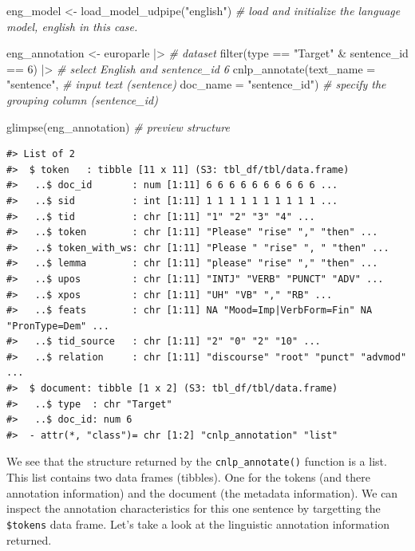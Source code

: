 \documentclass[
  letterpaper,
]{scrbook}
\newenvironment{Shaded}{\begin{snugshade}}{\end{snugshade}}
\newcommand{\AttributeTok}[1]{\textcolor[rgb]{0.00,0.00,0.00}{#1}}
\newcommand{\CommentTok}[1]{\textcolor[rgb]{0.00,0.00,0.00}{\textit{#1}}}
\newcommand{\DecValTok}[1]{\textcolor[rgb]{0.00,0.00,0.00}{#1}}
\newcommand{\FunctionTok}[1]{\textcolor[rgb]{0.00,0.00,0.00}{#1}}
\newcommand{\NormalTok}[1]{\textcolor[rgb]{0.00,0.00,0.00}{#1}}
\newcommand{\OtherTok}[1]{\textcolor[rgb]{0.00,0.00,0.00}{#1}}
\newcommand{\SpecialCharTok}[1]{\textcolor[rgb]{0.00,0.00,0.00}{#1}}
\newcommand{\StringTok}[1]{\textcolor[rgb]{0.00,0.00,0.00}{#1}}
\begin{document}
\begin{Shaded}
\begin{Highlighting}[]
\NormalTok{eng\_model }\OtherTok{\textless{}{-}} \FunctionTok{load\_model\_udpipe}\NormalTok{(}\StringTok{"english"}\NormalTok{) }\CommentTok{\# load and initialize the language model, \textquotesingle{}english\textquotesingle{} in this case.}

\NormalTok{eng\_annotation }\OtherTok{\textless{}{-}} 
\NormalTok{  europarle }\SpecialCharTok{|\textgreater{}} \CommentTok{\# dataset }
  \FunctionTok{filter}\NormalTok{(type }\SpecialCharTok{==} \StringTok{"Target"} \SpecialCharTok{\&}\NormalTok{ sentence\_id }\SpecialCharTok{==} \DecValTok{6}\NormalTok{) }\SpecialCharTok{|\textgreater{}} \CommentTok{\# select English and sentence\_id 6}
  \FunctionTok{cnlp\_annotate}\NormalTok{(}\AttributeTok{text\_name =} \StringTok{"sentence"}\NormalTok{, }\CommentTok{\# input text (sentence)}
                \AttributeTok{doc\_name =} \StringTok{"sentence\_id"}\NormalTok{) }\CommentTok{\# specify the grouping column (sentence\_id)}

\FunctionTok{glimpse}\NormalTok{(eng\_annotation) }\CommentTok{\# preview structure}
\end{Highlighting}
\end{Shaded}

\begin{verbatim}
#> List of 2
#>  $ token   : tibble [11 x 11] (S3: tbl_df/tbl/data.frame)
#>   ..$ doc_id       : num [1:11] 6 6 6 6 6 6 6 6 6 6 ...
#>   ..$ sid          : int [1:11] 1 1 1 1 1 1 1 1 1 1 ...
#>   ..$ tid          : chr [1:11] "1" "2" "3" "4" ...
#>   ..$ token        : chr [1:11] "Please" "rise" "," "then" ...
#>   ..$ token_with_ws: chr [1:11] "Please " "rise" ", " "then" ...
#>   ..$ lemma        : chr [1:11] "please" "rise" "," "then" ...
#>   ..$ upos         : chr [1:11] "INTJ" "VERB" "PUNCT" "ADV" ...
#>   ..$ xpos         : chr [1:11] "UH" "VB" "," "RB" ...
#>   ..$ feats        : chr [1:11] NA "Mood=Imp|VerbForm=Fin" NA "PronType=Dem" ...
#>   ..$ tid_source   : chr [1:11] "2" "0" "2" "10" ...
#>   ..$ relation     : chr [1:11] "discourse" "root" "punct" "advmod" ...
#>  $ document: tibble [1 x 2] (S3: tbl_df/tbl/data.frame)
#>   ..$ type  : chr "Target"
#>   ..$ doc_id: num 6
#>  - attr(*, "class")= chr [1:2] "cnlp_annotation" "list"
\end{verbatim}

We see that the structure returned by the \texttt{cnlp\_annotate()}
function is a list. This list contains two data frames (tibbles). One
for the tokens (and there annotation information) and the document (the
metadata information). We can inspect the annotation characteristics for
this one sentence by targetting the \texttt{\$tokens} data frame. Let's
take a look at the linguistic annotation information returned.
\end{document}

